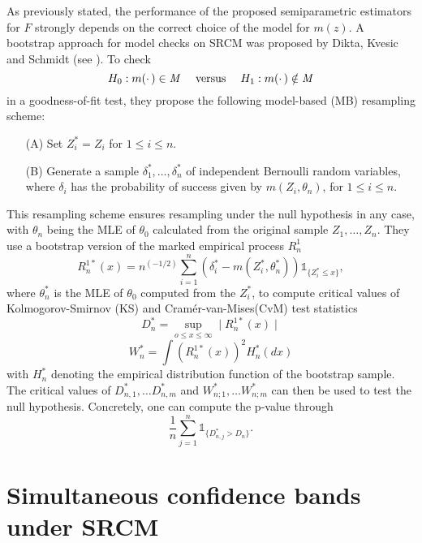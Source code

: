 As previously stated, the performance of the proposed semiparametric estimators for $F$ strongly depends on the correct choice of the model for $m(z)$. A bootstrap approach for model checks on SRCM was proposed by Dikta, Kvesic and Schmidt (see \cite{PAPER4}). To check
\[
H_0: m(\cdotp) \in \mathit{M} \text{\hspace{3ex}versus\hspace{3ex}} H_1:  m(\cdotp) \notin \mathit{M}
\] 
in a goodness-of-fit test, they propose the following model-based (MB) resampling scheme:
\begin{resampling_scheme}\label{mb_rs}
\begin{enumerate}
\item[(A)] Set $Z_i^* = Z_i$ for $1 \leq i \leq n$.
\item[(B)] Generate a sample $\delta_1^*,\ldots,\delta_n^*$ of independent Bernoulli random variables, where $\delta_i$ has the probability of success given by $m(Z_i,\theta_n)$, for $1 \leq i \leq n$. 
\end{enumerate}
\end{resampling_scheme}
This resampling scheme ensures resampling under the null hypothesis in any case, with $\theta_n$ being the MLE of $\theta_0$ calculated from the original sample $Z_1,\ldots,Z_n$.
They use a bootstrap version of the marked empirical process $R_n^1$ 
\[
R_n^{1*}(x) = n^{(-1/2)}\sum_{i=1}^n\left( \delta_i^* - m(Z_i^*,\theta_n^*)\right) \mathbb{1}_{\{Z_i^*\leq x\}}, 
\]
where $\theta_n^*$ is the MLE of $\theta_0$ computed from the $Z_i^*$,
to compute critical values of Kolmogorov-Smirnov (KS) and Cramér-van-Mises(CvM) test statistics
\[
D_n^* = \sup_{o\leq x \leq \infty} \mid R_n^{1*}(x)\mid
\]
\[
W_n^*  = \int (R_n^{1*}(x))^2 H_n^*(dx)
\]
with $H_n^*$ denoting the empirical distribution function of the bootstrap sample.
The critical values of $D_{n,1}^*,\ldots D_{n,m}^*$ and $W_{n;1}^*,\ldots W_{n;m}^*$ can then be used to test the null hypothesis. Concretely, one can compute the p-value through 
\[
\frac{1}{n} \sum_{j=1}^n \mathbb{1}_{\{D_{n,j}^*>D_n\}}.
\]

\section{Simultaneous confidence bands under SRCM}

